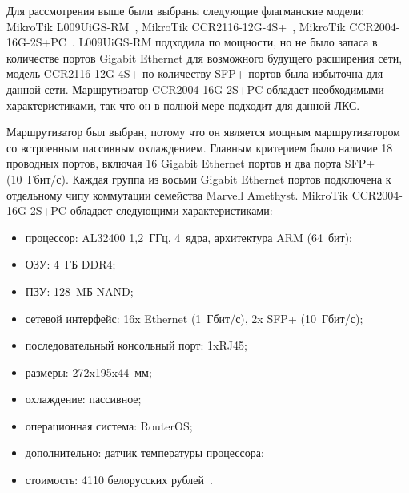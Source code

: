 Для рассмотрения выше были выбраны следующие флагманские модели: MikroTik L009UiGS-RM~\cite{L009UiGS-RM}, MikroTik CCR2116-12G-4S+~\cite{CCR2116-12G-4S}, MikroTik CCR2004-16G-2S+PC~\cite{CCR2004-16G-2SPC}. L009UiGS-RM подходила по мощности, но не было запаса в количестве портов Gigabit Ethernet для возможного будущего расширения сети, модель CCR2116-12G-4S+ по количеству SFP+ портов была избыточна для данной сети. Маршрутизатор CCR2004-16G-2S+PC обладает необходимыми характеристиками, так что он в полной мере подходит для данной ЛКС.

Маршрутизатор был выбран, потому что он является мощным маршрутизатором со встроенным пассивным охлаждением. Главным критерием было наличие 18 проводных портов, включая 16 Gigabit Ethernet портов и два порта SFP+ (10~Гбит/с). Каждая группа из восьми Gigabit Ethernet портов подключена к отдельному чипу коммутации семейства Marvell Amethyst. MikroTik CCR2004-16G-2S+PC обладает следующими характеристиками:

\begin{itemize}
    \item процессор: AL32400 1,2~ГГц, 4~ядра, архитектура ARM (64~бит);
    \item ОЗУ: 4~ГБ DDR4;
    \item ПЗУ: 128~MБ NAND;
    \item сетевой интерфейс: 16x Ethernet (1~Гбит/с), 2x SFP+ (10~Гбит/с);
    \item последовательный консольный порт: 1xRJ45;
    \item размеры: 272x195x44~мм;
    \item охлаждение: пассивное;
    \item операционная система: RouterOS;
    \item дополнительно: датчик температуры процессора;
    \item стоимость: 4110 белорусских рублей~\cite{CCR2004-16G-2SPC}.
\end{itemize}


